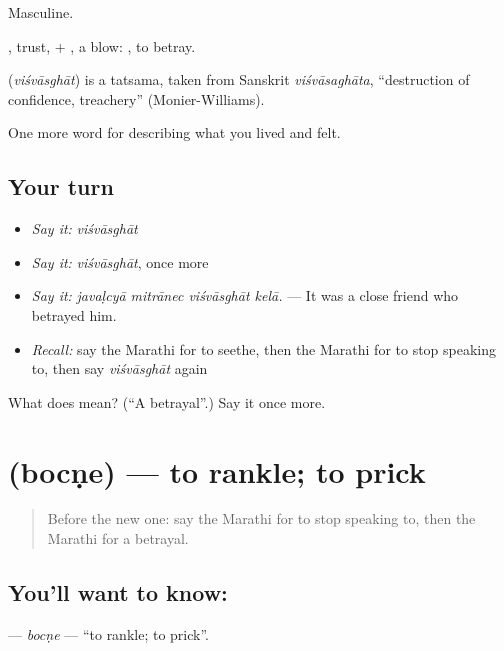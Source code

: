 Masculine.

, trust, + , a blow:  , to betray.

\begin{cousinweb}
\textbf{} (\emph{viśvāsghāt}) is a tatsama, taken from Sanskrit \emph{viśvāsaghāta}, \textquotedblleft{}destruction of confidence, treachery\textquotedblright{} (Monier-Williams).
\end{cousinweb}

\begin{grammarlens}[title={What you've built}]
One more word for describing what you lived and felt.
\end{grammarlens}

\subsection*{Your turn}
\begin{itemize}
\raggedright
  \item \emph{Say it:} \emph{viśvāsghāt}
  \item \emph{Say it:} \emph{viśvāsghāt}, once more
  \item \emph{Say it:} \emph{javaḷcyā mitrānec viśvāsghāt kelā.} — It was a close friend who betrayed him.
  \item \emph{Recall:} say the Marathi for to seethe, then the Marathi for to stop speaking to, then say \emph{viśvāsghāt} again
\end{itemize}

\begin{tcolorbox}[breakable,colback=teal!4,colframe=teal!35!black,title={Before you move on}]
What does  mean? (\textquotedblleft{}A betrayal\textquotedblright{}.) Say it once more.
\end{tcolorbox}
\section[\texorpdfstring{\mr{बोचणे} (bocṇe)}{बोचणे (bocṇe)}]{ (bocṇe) — to rankle; to prick}

\label{lesson:MR-C503-bocne}



\begin{quote}
Before the new one: say the Marathi for to stop speaking to, then the Marathi for a betrayal.
\end{quote}

\subsection*{You'll want to know: }
\textbf{} — \emph{bocṇe} — \textquotedblleft{}to rankle; to prick\textquotedblright{}.

